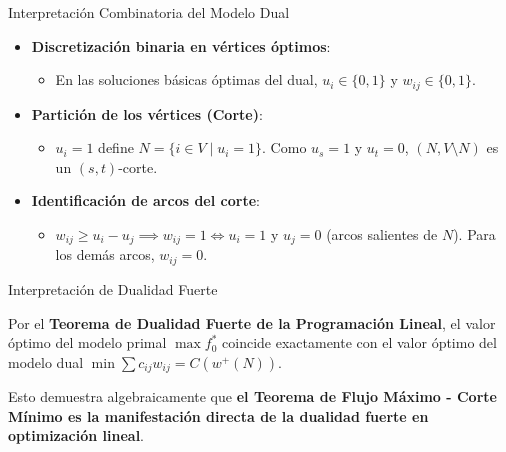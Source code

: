 \documentclass[
  ignorenonframetext,
]{beamer}
\providecommand{\tightlist}{%
  \setlength{\itemsep}{0pt}\setlength{\parskip}{0pt}}
\begin{document}
\begin{frame}{Interpretación Combinatoria del Modelo Dual}
\label{interpretaciuxf3n-combinatoria-del-modelo-dual}
\begin{itemize}
\tightlist
\item
  \textbf{Discretización binaria en vértices óptimos}:

  \begin{itemize}
  \tightlist
  \item
    En las soluciones básicas óptimas del dual, \(u_i \in \{0, 1\}\) y
    \(w_{ij} \in \{0, 1\}\).
  \end{itemize}
\item
  \textbf{Partición de los vértices (Corte)}:

  \begin{itemize}
  \tightlist
  \item
    \(u_i = 1\) define \(N = \{i \in V \mid u_i = 1\}\). Como
    \(u_s = 1\) y \(u_t = 0\), \((N, V \setminus N)\) es un
    \((s,t)\)-corte.
  \end{itemize}
\item
  \textbf{Identificación de arcos del corte}:

  \begin{itemize}
  \tightlist
  \item
    \(w_{ij} \ge u_i - u_j \implies w_{ij} = 1 \iff u_i = 1\) y
    \(u_j = 0\) (arcos salientes de \(N\)). Para los demás arcos,
    \(w_{ij} = 0\).
  \end{itemize}
\end{itemize}
\end{frame}

\begin{frame}{Interpretación de Dualidad Fuerte}
\label{interpretaciuxf3n-de-dualidad-fuerte}
\begin{tcolorbox}[enhanced jigsaw, opacityback=0, breakable, title=\textcolor{quarto-callout-note-color}{\faInfo}\hspace{0.5em}{Interpretación combinatoria y dualidad fuerte}, colback=white, colbacktitle=quarto-callout-note-color!10!white, bottomrule=.15mm, opacitybacktitle=0.6, coltitle=black, bottomtitle=1mm, leftrule=.75mm, colframe=quarto-callout-note-color-frame, toptitle=1mm, titlerule=0mm, rightrule=.15mm, left=2mm, arc=.35mm, toprule=.15mm]

Por el \textbf{Teorema de Dualidad Fuerte de la Programación Lineal}, el
valor óptimo del modelo primal \(\max f_0^*\) coincide exactamente con
el valor óptimo del modelo dual \(\min \sum c_{ij} w_{ij} = C(w^+(N))\).

Esto demuestra algebraicamente que \textbf{el Teorema de Flujo Máximo -
Corte Mínimo es la manifestación directa de la dualidad fuerte en
optimización lineal}.

\end{tcolorbox}
\end{frame}
\end{document}
